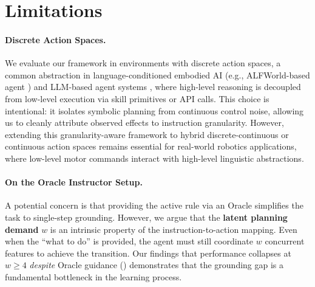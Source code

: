 \documentclass[11pt]{article}
\begin{document}
\section{Limitations}
\label{sec:limitations}

\paragraph{Discrete Action Spaces.} We evaluate our framework in environments with discrete action spaces, a common abstraction in language-conditioned embodied AI (e.g., ALFWorld-based agent \citep{xiong-etal-2025-mpo, kim-etal-2025-reflact}) and LLM-based agent systems \citep{DBLP:conf/iclr/QinLYZYLLCTQZHT24, DBLP:conf/nips/PatilZ0G24}, where high-level reasoning is decoupled from low-level execution via skill primitives or API calls. This choice is intentional: it isolates symbolic planning from continuous control noise, allowing us to cleanly attribute observed effects to instruction granularity. However, extending this granularity-aware framework to hybrid discrete-continuous or continuous action spaces remains essential for real-world robotics applications, where low-level motor commands interact with high-level linguistic abstractions.

\paragraph{On the Oracle Instructor Setup.} A potential concern is that providing the active rule via an Oracle simplifies the task to single-step grounding. However, we argue that the \textbf{latent planning demand} $w$ is an intrinsic property of the instruction-to-action mapping. Even when the ``what to do'' is provided, the agent must still coordinate $w$ concurrent features to achieve the transition. Our findings that performance collapses at $w \ge 4$ \emph{despite} Oracle guidance () demonstrates that the grounding gap is a fundamental bottleneck in the learning process.

\end{document}
